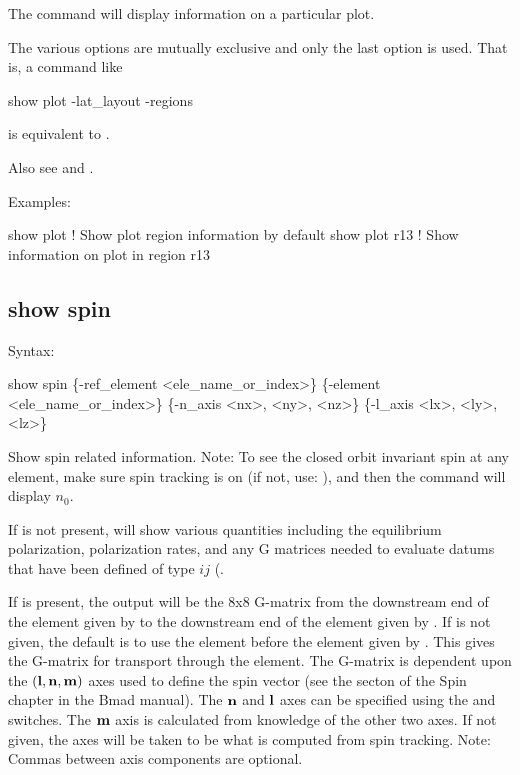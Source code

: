 {{{{{{{{{The  command will display information on a
particular plot.

The various  options are mutually exclusive and only the last option is used. That is,
a command like
\begin{example}
  show plot -lat_layout -regions
\end{example}
is equivalent to .

Also see  and .

Examples:
\begin{example}
  show plot      ! Show plot region information by default
  show plot r13  ! Show information on plot in region r13
\end{example}


\subsection{show spin}
\label{s:show.spin}

Syntax:
\begin{example}
  show spin \{-ref_element <ele_name_or_index>\} \{-element <ele_name_or_index>\} 
                                    \{-n_axis <nx>, <ny>, <nz>\} \{-l_axis <lx>, <ly>, <lz>\}
\end{example}

Show spin related information. 
Note: To see the closed orbit invariant spin at any element, make sure spin tracking is on (if not,
use: ), and then the  command will display $n_0$.

If  is not present,  will show various quantities including the
equilibrium polarization, polarization rates, and any G matrices needed to evaluate datums that
have been defined of type $ij$ (.

If  is present, the output will be the 8x8 G-matrix from the downstream end of the
element given by  to the downstream end of the element given by .
If  is not given, the default is to use the element before the element given
by . This gives the G-matrix for transport through the  element.
The G-matrix is dependent upon the $({\bf l}, {\bf n}, {\bf m})$ axes used to define the spin vector (see
the  secton of the Spin chapter in the Bmad manual). The ${\bf n}$ and ${\bf l}$ axes
can be specified using the  and  switches. The ${\bf m}$ axis is calculated
from knowledge of the other two axes. If not given, the axes will be taken to be what is computed from
spin tracking. Note: Commas between axis components are optional.

}}}}}}}}}
